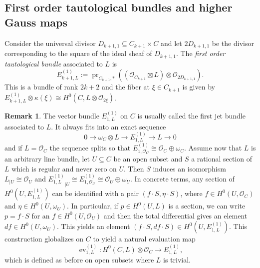 \documentclass[12pt]{amsart}
\newcounter{thmcounter}
\numberwithin{equation}{section}
\numberwithin{thmcounter}{section}
\theoremstyle{definition}
\newtheorem{remark}[thmcounter]{Remark}
\theoremstyle{claim}
\newcommand{\sO}{\mathscr{O}}
\DeclareMathOperator{\pr}{pr}
\begin{document}
\subsection{First order tautological bundles and higher Gauss maps}

Consider the universal divisor $D_{k+1,1}\subseteq C_{k+1}\times C$ and let $2D_{k+1,1}$ be the divisor corresponding to the square of the ideal sheaf of  $D_{k+1,1}$. The \emph{first order tautological bundle} associated to $L$ is
\[ E^{(1)}_{k+1,L} := \pr_{C_{k+1},*}((\sO_{C_{k+1}} \boxtimes L) \otimes \sO_{2D_{k+1,1}} ). \]
This is a bundle of rank $2k+2$ and the fiber at $\xi\in C_{k+1}$ is given by $E^{(1)}_{k+1,L} \otimes \kappa(\xi) \cong H^0(C,L\otimes \sO_{2\xi})$.

\begin{remark}\label{rem:jetbundle}
	The vector bundle $E^{(1)}_{1,L}$ on $C$ is usually called the first jet bundle associated to $L$. It always fits into an exact sequence
	\[ 0 \longrightarrow \omega_C\otimes L \longrightarrow E^{(1)}_{1,L} \longrightarrow L \longrightarrow 0 \]
	and if $L=\sO_C$ the sequence splits so that $E^{(1)}_{1,\sO_C} \cong \sO_C\oplus \omega_C$. Assume now that $L$ is an arbitrary line bundle, let $U\subseteq C$ be an open subset and $S$ a rational section of $L$ which is regular and never zero on $U$. Then $S$ induces an isomorphism $L_{|U}\cong \sO_U$ and ${E^{(1)}_{1,L}}_{|U} \cong E^{(1)}_{1,\sO_U} \cong \sO_U \oplus \omega_U$. In concrete terms, any section of $H^0(U,E^{(1)}_{1,L})$ can be identified with a pair $(f\cdot S,\eta\cdot S)$, where $f \in H^0(U,\sO_C)$ and $\eta \in H^0(U,\omega_U)$.  In particular, if $p\in H^0(U,L)$ is a section, we can write $p=f\cdot S$ for an $f\in H^0(U,\sO_U)$ and then the total differential gives an element $df\in H^0(U,\omega_U)$. This yields an element $(f\cdot S,df\cdot S) \in H^0(U,E^{(1)}_{1,L})$. This construction globalizes on $C$ to yield a natural evaluation map
	\[ \operatorname{ev}^{(1)}_{1,L}\colon  H^0(C,L)\otimes \sO_C \longrightarrow E^{(1)}_{1,L}, \]
	which is defined as before on open subsets where $L$ is trivial.
\end{remark}
\end{document}
